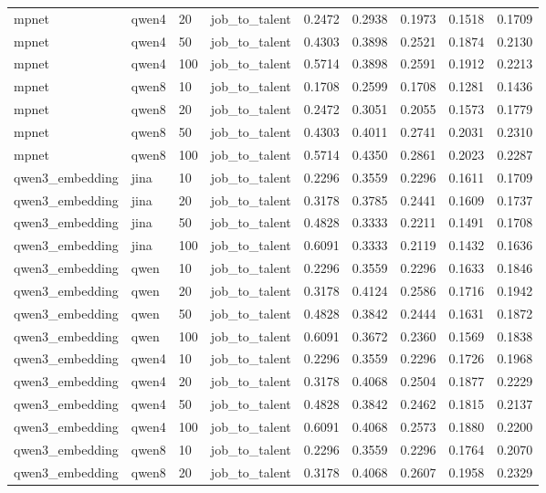 \begin{table}[t]
\begin{tabular}{lllllllll}
mpnet & qwen4 & 20 & job_to_talent & 0.2472 & 0.2938 & 0.1973 & 0.1518 & 0.1709 \\
mpnet & qwen4 & 50 & job_to_talent & 0.4303 & 0.3898 & 0.2521 & 0.1874 & 0.2130 \\
mpnet & qwen4 & 100 & job_to_talent & 0.5714 & 0.3898 & 0.2591 & 0.1912 & 0.2213 \\
mpnet & qwen8 & 10 & job_to_talent & 0.1708 & 0.2599 & 0.1708 & 0.1281 & 0.1436 \\
mpnet & qwen8 & 20 & job_to_talent & 0.2472 & 0.3051 & 0.2055 & 0.1573 & 0.1779 \\
mpnet & qwen8 & 50 & job_to_talent & 0.4303 & 0.4011 & 0.2741 & 0.2031 & 0.2310 \\
mpnet & qwen8 & 100 & job_to_talent & 0.5714 & 0.4350 & 0.2861 & 0.2023 & 0.2287 \\
qwen3_embedding & jina & 10 & job_to_talent & 0.2296 & 0.3559 & 0.2296 & 0.1611 & 0.1709 \\
qwen3_embedding & jina & 20 & job_to_talent & 0.3178 & 0.3785 & 0.2441 & 0.1609 & 0.1737 \\
qwen3_embedding & jina & 50 & job_to_talent & 0.4828 & 0.3333 & 0.2211 & 0.1491 & 0.1708 \\
qwen3_embedding & jina & 100 & job_to_talent & 0.6091 & 0.3333 & 0.2119 & 0.1432 & 0.1636 \\
qwen3_embedding & qwen & 10 & job_to_talent & 0.2296 & 0.3559 & 0.2296 & 0.1633 & 0.1846 \\
qwen3_embedding & qwen & 20 & job_to_talent & 0.3178 & 0.4124 & 0.2586 & 0.1716 & 0.1942 \\
qwen3_embedding & qwen & 50 & job_to_talent & 0.4828 & 0.3842 & 0.2444 & 0.1631 & 0.1872 \\
qwen3_embedding & qwen & 100 & job_to_talent & 0.6091 & 0.3672 & 0.2360 & 0.1569 & 0.1838 \\
qwen3_embedding & qwen4 & 10 & job_to_talent & 0.2296 & 0.3559 & 0.2296 & 0.1726 & 0.1968 \\
qwen3_embedding & qwen4 & 20 & job_to_talent & 0.3178 & 0.4068 & 0.2504 & 0.1877 & 0.2229 \\
qwen3_embedding & qwen4 & 50 & job_to_talent & 0.4828 & 0.3842 & 0.2462 & 0.1815 & 0.2137 \\
qwen3_embedding & qwen4 & 100 & job_to_talent & 0.6091 & 0.4068 & 0.2573 & 0.1880 & 0.2200 \\
qwen3_embedding & qwen8 & 10 & job_to_talent & 0.2296 & 0.3559 & 0.2296 & 0.1764 & 0.2070 \\
qwen3_embedding & qwen8 & 20 & job_to_talent & 0.3178 & 0.4068 & 0.2607 & 0.1958 & 0.2329 \\

\end{tabular}
\end{table}
